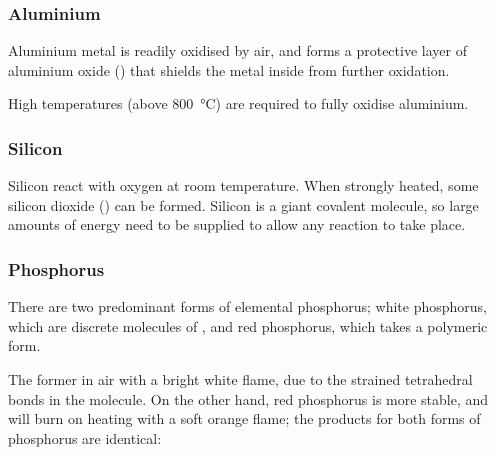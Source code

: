 

			\pagebreak
			\subsubsection{Aluminium}

				Aluminium metal is readily oxidised by air, and forms a protective layer of aluminium oxide () that shields the
				metal inside from further oxidation.

				High temperatures (above \SI{800}{\celsius}) are required to fully oxidise aluminium.



			\subsubsection{Silicon}

				Silicon  react with oxygen at room temperature. When strongly heated, some silicon dioxide () can be
				formed. Silicon is a giant covalent molecule, so large amounts of energy need to be supplied to allow any reaction to
				take place.



			\subsubsection{Phosphorus}

				There are two predominant forms of elemental phosphorus; white phosphorus, which are discrete molecules of , and red
				phosphorus, which takes a polymeric form.

				The former  in air with a bright white flame, due to the strained tetrahedral bonds in the molecule.
				On the other hand, red phosphorus is more stable, and will burn on heating with a soft orange flame; the products for both
				forms of phosphorus are identical:


